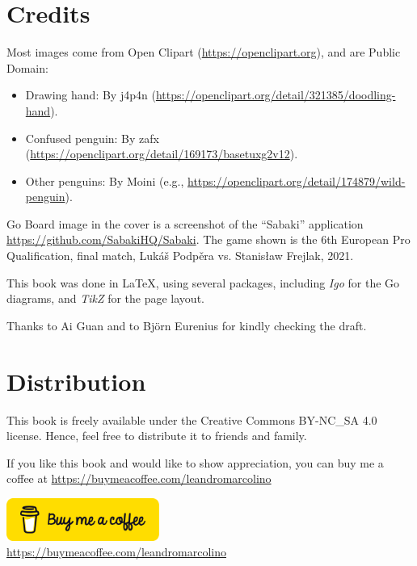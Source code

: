 \documentclass[a4paper,12pt]{extarticle}
\begin{document}
\section*{Credits}
Most images come from Open Clipart (\url{https://openclipart.org}), and are Public Domain:

\vspace{0.25cm}

\noindent\hspace{-0.5cm}\begin{minipage}{10cm}
\begin{itemize}
\item Drawing hand: By j4p4n (\url{https://openclipart.org/detail/321385/doodling-hand}).
\item Confused penguin: By zafx (\url{https://openclipart.org/detail/169173/basetuxg2v12}).
\item Other penguins: By Moini (e.g., \url{https://openclipart.org/detail/174879/wild-penguin}).
\end{itemize}
\end{minipage}

\vspace{0.25cm}

Go Board image in the cover is a screenshot of the ``Sabaki'' application \url{https://github.com/SabakiHQ/Sabaki}. The game shown is the 6th European Pro Qualification, final match, Lukáš Podpěra vs. Stanisław Frejlak, 2021.

This book was done in \LaTeX, using several packages, including \emph{Igo} for the Go diagrams, and \emph{TikZ} for the page layout.

Thanks to Ai Guan and to Björn Eurenius for kindly checking the draft.

\section*{Distribution}

This book is freely available under the Creative Commons BY-NC\_SA 4.0 license. Hence, feel free to distribute it to friends and family.

If you like this book and would like to show appreciation, you can buy me a coffee at \url{https://buymeacoffee.com/leandromarcolino}

\begin{center}
  \href{https://buymeacoffee.com/leandromarcolino}{\includegraphics[width=5.0cm]{imgs/bmc-button.png}}\\
  \url{https://buymeacoffee.com/leandromarcolino}
\end{center}
\end{document}
